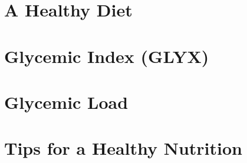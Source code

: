 \documentclass[../main.tex]{subfiles}
\begin{document}
%

%


%

%


\chapter{A Healthy Diet}


\chapter{Glycemic Index (GLYX)}



\chapter{Glycemic Load}



\chapter{Tips for a Healthy Nutrition}
\end{document}
